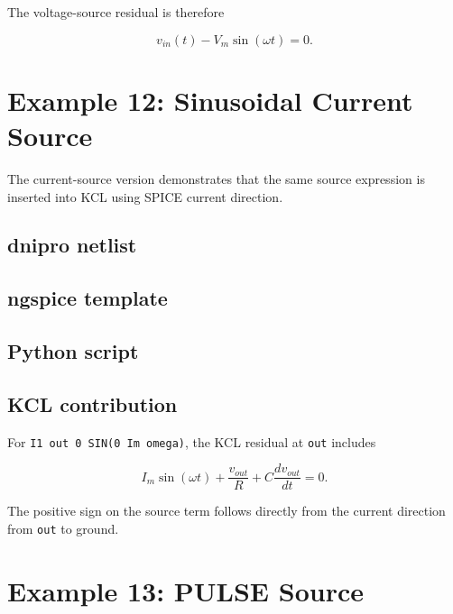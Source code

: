 \documentclass[11pt,a4paper]{article}
\newcommand{\code}[1]{\texttt{#1}}
\begin{document}
The voltage-source residual is therefore

\begin{equation}
    v_{in}(t) - V_m\sin(\omega t) = 0.
\end{equation}

\section{Example 12: Sinusoidal Current Source}
\label{sec:ex-sine-current}

The current-source version demonstrates that the same source expression is
inserted into KCL using SPICE current direction.

\subsection{dnipro netlist}



\subsection{ngspice template}



\subsection{Python script}



\subsection{KCL contribution}

For \code{I1 out 0 SIN(0 Im omega)}, the KCL residual at \code{out} includes

\begin{equation}
    I_m\sin(\omega t) + \frac{v_{out}}{R}
        + C\frac{d v_{out}}{dt} = 0.
\end{equation}

The positive sign on the source term follows directly from the current direction
from \code{out} to ground.

\section{Example 13: PULSE Source}
\label{sec:ex-pulse}
\end{document}
